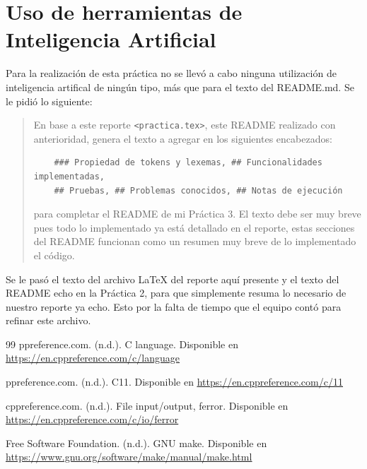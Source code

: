 \documentclass[12pt,letterpaper]{article}
\begin{document}
\bigskip


\section*{Uso de herramientas de Inteligencia Artificial}

Para la realización de esta práctica no se llevó a cabo ninguna utilización de inteligencia artifical de ningún
tipo, más que para el texto del README.md. Se le pidió lo siguiente:

\begin{quote}
  En base a este reporte \texttt{<practica.tex>}, este README realizado con anterioridad, genera el texto
  a agregar en los siguientes encabezados:

  \begin{verbatim}
    ### Propiedad de tokens y lexemas, ## Funcionalidades implementadas,
    ## Pruebas, ## Problemas conocidos, ## Notas de ejecución
  \end{verbatim}
  
  para completar el README de mi Práctica 3. El texto debe ser muy breve pues todo lo implementado ya está
  detallado en el reporte, estas secciones del README funcionan como un resumen muy breve de lo implementado
  el código.
\end{quote}

Se le pasó el texto del archivo LaTeX del reporte aquí presente y el texto del README echo en la Práctica 2,
para que simplemente resuma lo necesario de nuestro reporte ya echo. Esto por la falta de tiempo que el equipo
contó para refinar este archivo.

\bigskip


\begin{thebibliography}{99}
  ppreference.com. (n.d.). C language. Disponible en \textcolor{links}{\uline{\url{https://en.cppreference.com/c/language}}}

  ppreference.com. (n.d.). C11. Disponible en \textcolor{links}{\uline{\url{https://en.cppreference.com/c/11}}}

  cppreference.com. (n.d.). File input/output, ferror. Disponible en
  \textcolor{links}{\uline{\url{https://en.cppreference.com/c/io/ferror}}}

  Free Software Foundation. (n.d.). GNU make. Disponible en
  \textcolor{links}{\uline{\url{https://www.gnu.org/software/make/manual/make.html}}}
\end{thebibliography}
\end{document}

